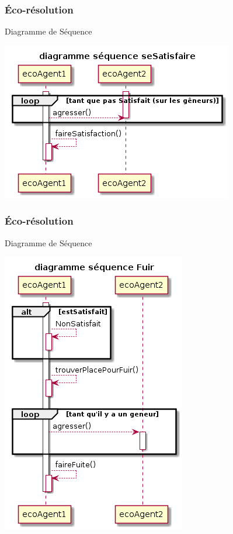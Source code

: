\begin{frame}
    \frametitle{Éco-résolution}
    		\begin{block}{Diagramme de Séquence}
    		    		\begin{center}

    		     \includegraphics[scale=0.4]{diagrams/sequenceEcoResolution1.png}
    		\end{center}

    		\end{block}

\end{frame}

\begin{frame}
    \frametitle{Éco-résolution}
    		\begin{block}{Diagramme de Séquence}
    		    		\begin{center}

    		     \includegraphics[scale=0.4]{diagrams/sequenceEcoResolution2.png}
    		\end{center}

    		\end{block}

\end{frame}